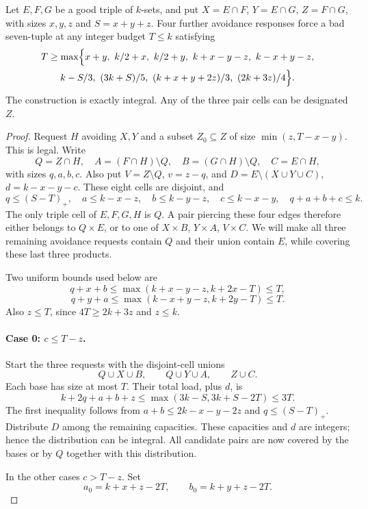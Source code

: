 \begin{lemma}\label{lem:fourcase}
Let $E,F,G$ be a good triple of $k$-sets, and put $X=E\cap F$, $Y=E\cap G$, $Z=F\cap G$, with sizes $x,y,z$ and $S=x+y+z$. Four further avoidance responses force a bad seven-tuple at any integer budget $T\le k$ satisfying
\[
\begin{gathered}
T\ge\max\Bigl\{x+y,\ k/2+x,\ k/2+y,\ k+x-y-z,\ k-x+y-z,\\
 k-S/3,\ (3k+S)/5,\ (k+x+y+2z)/3,\ (2k+3z)/4\Bigr\}.
\end{gathered}
\]
The construction is exactly integral. Any of the three pair cells can be designated $Z$.
\end{lemma}
\begin{proof}
Request $H$ avoiding $X,Y$ and a subset $Z_0\subseteq Z$ of size $\min(z,T-x-y)$. This is legal. Write
\[
Q=Z\cap H,\quad A=(F\cap H)\setminus Q,\quad B=(G\cap H)\setminus Q,\quad C=E\cap H,
\]
with sizes $q,a,b,c$. Also put $V=Z\setminus Q$, $v=z-q$, and $D=E\setminus(X\cup Y\cup C)$, $d=k-x-y-c$. These eight cells are disjoint, and
\[
q\le(S-T)_+,\quad a\le k-x-z,\quad b\le k-y-z,\quad c\le k-x-y,\quad q+a+b+c\le k.
\]
The only triple cell of $E,F,G,H$ is $Q$. A pair piercing these four edges therefore either belongs to $Q\times E$, or to one of $X\times B$, $Y\times A$, $V\times C$. We will make all three remaining avoidance requests contain $Q$ and their union contain $E$, while covering these last three products.

Two uniform bounds used below are
\[
q+x+b\le\max(k+x-y-z,k+2x-T)\le T,
\]
\[
q+y+a\le\max(k-x+y-z,k+2y-T)\le T.
\]
Also $z\le T$, since $4T\ge2k+3z$ and $z\le k$.

\paragraph{Case 0: $c\le T-z$.} Start the three requests with the disjoint-cell unions
\[
Q\cup X\cup B,\qquad Q\cup Y\cup A,\qquad Z\cup C.
\]
Each base has size at most $T$. Their total load, plus $d$, is
\[
k+2q+a+b+z\le\max(3k-S,3k+S-2T)\le3T.
\]
The first inequality follows from $a+b\le2k-x-y-2z$ and $q\le(S-T)_+$. Distribute $D$ among the remaining capacities. These capacities and $d$ are integers; hence the distribution can be integral. All candidate pairs are now covered by the bases or by $Q$ together with this distribution.

In the other cases $c>T-z$. Set
\[
a_0=k+x+z-2T,\qquad b_0=k+y+z-2T.
\]


\end{proof}
